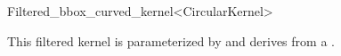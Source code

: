 \begin{ccRefClass}{Filtered_bbox_curved_kernel<CircularKernel>}

\ccDefinition



\ccParameters

This filtered kernel is parameterized by and derives from a . 

\ccInheritsFrom


\end{ccRefClass}
